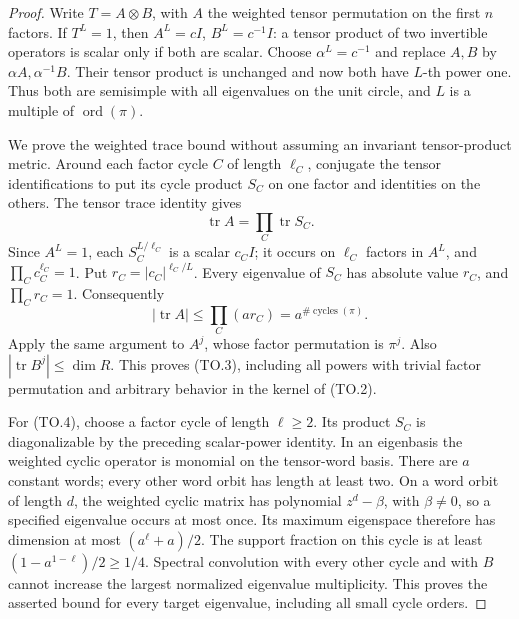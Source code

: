 \begin{proof}
Write \(T=A\otimes B\), with \(A\) the weighted tensor permutation
on the first \(n\) factors. If \(T^L=1\), then
\(A^L=cI\), \(B^L=c^{-1}I\): a tensor product of two invertible
operators is scalar only if both are scalar. Choose
\(\alpha^L=c^{-1}\) and replace \(A,B\) by
\(\alpha A,\alpha^{-1}B\). Their tensor product is unchanged and
now both have \(L\)-th power one. Thus both are semisimple with
all eigenvalues on the unit circle, and \(L\) is a multiple of
\(\operatorname{ord}(\pi)\).

We prove the weighted trace bound without assuming an invariant
tensor-product metric. Around each factor cycle \(C\) of length
\(\ell_C\), conjugate the tensor identifications to put its cycle
product \(S_C\) on one factor and identities on the others.
The tensor trace identity gives
\[
                  \operatorname{tr}A=\prod_C\operatorname{tr}S_C.
 \tag{TO.6}
\]
Since \(A^L=1\), each \(S_C^{L/\ell_C}\) is a scalar \(c_CI\);
it occurs on \(\ell_C\) factors in \(A^L\), and
\(\prod_Cc_C^{\ell_C}=1\). Put
\(r_C=|c_C|^{\ell_C/L}\). Every eigenvalue of \(S_C\) has
absolute value \(r_C\), and \(\prod_Cr_C=1\). Consequently
\[
 |\operatorname{tr}A|
      \le\prod_C(ar_C)=a^{\#\operatorname{cycles}(\pi)}.
 \tag{TO.7}
\]
Apply the same argument to \(A^j\), whose factor permutation is
\(\pi^j\). Also \(|\operatorname{tr}B^j|\le\dim R\).
This proves (TO.3), including all powers with trivial factor
permutation and arbitrary behavior in the kernel of (TO.2).

For (TO.4), choose a factor cycle of length \(\ell\ge2\).
Its product \(S_C\) is diagonalizable by the preceding scalar-power
identity. In an eigenbasis the weighted cyclic operator is monomial
on the tensor-word basis. There are \(a\) constant words; every other
word orbit has length at least two. On a word orbit of length \(d\),
the weighted cyclic matrix has polynomial \(z^d-\beta\), with
\(\beta\ne0\), so a specified eigenvalue occurs at most once.
Its maximum eigenspace therefore has dimension at most
\((a^\ell+a)/2\). The support fraction on this cycle is at least
\((1-a^{1-\ell})/2\ge1/4\). Spectral convolution with every other
cycle and with \(B\) cannot increase the largest normalized
eigenvalue multiplicity. This proves the asserted bound for
every target eigenvalue, including all small cycle orders.


\end{proof}
